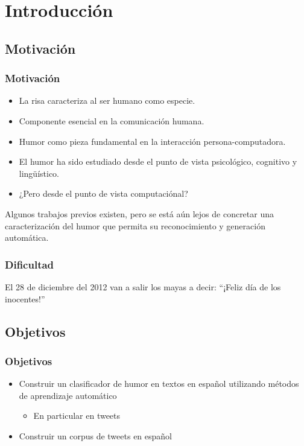 \section{Introducción} 

\subsection{Motivación}

\begin{frame}[allowframebreaks]
    \frametitle{Motivación}
    \begin{itemize}
        \item La risa caracteriza al ser humano como especie.
        \item Componente esencial en la comunicación humana.
        \item Humor como pieza fundamental en la interacción persona-computadora.
    \end{itemize}

    \framebreak
    
    \begin{itemize}
        \item El humor ha sido estudiado desde el punto de vista psicológico, cognitivo y lingüístico.
        \item ¿Pero desde el punto de vista computaciónal?
    \end{itemize}
    Algunos trabajos previos existen, pero se está aún lejos de concretar una caracterización del humor que permita su reconocimiento y generación automática.
\end{frame}

\begin{frame}
    \frametitle{Dificultad}
    El 28 de diciembre del 2012 van a salir los mayas a decir: ``¡Feliz día de los inocentes!''
\end{frame}

\subsection{Objetivos}

\begin{frame}
    \frametitle{Objetivos}
    \begin{itemize}
        \item Construir un clasificador de humor en textos en español utilizando métodos de aprendizaje automático
            \begin{itemize}
                \item En particular en tweets
            \end{itemize}
        \item Construir un corpus de tweets en español
    \end{itemize}
\end{frame}
